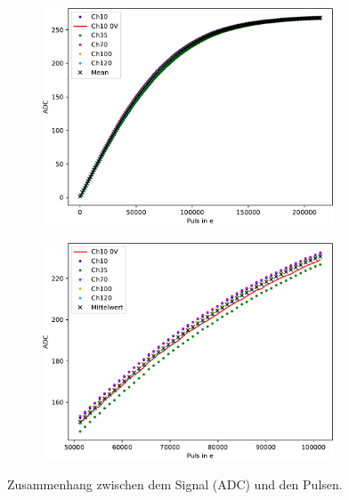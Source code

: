 \begin{figure}[H]
\centering
\begin{subfigure}{.5\textwidth}
	\centering
	\includegraphics[width=0.95\textwidth]{build/Calib.pdf}
	\caption{}
	\label{fig:calib}
\end{subfigure}%
\begin{subfigure}{.5\textwidth}
	\centering
	\includegraphics[width=0.95\textwidth]{build/Calib_detail.pdf}
	\caption{}
	\label{fig:calib_detail}
\end{subfigure}
\caption{Zusammenhang zwischen dem Signal (ADC) und den Pulsen.}
\label{fig:calib}
\end{figure}

